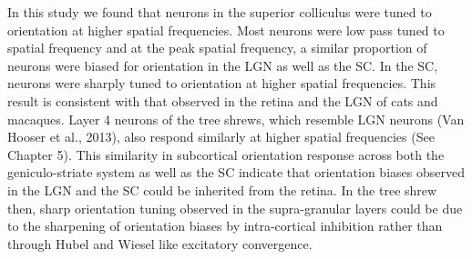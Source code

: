 In this study we found that neurons in the superior colliculus were
tuned to orientation at higher spatial frequencies. Most neurons were
low pass tuned to spatial frequency and at the peak spatial frequency, a
similar proportion of neurons were biased for orientation in the LGN as
well as the SC. In the SC, neurons were sharply tuned to orientation at
higher spatial frequencies. This result is consistent with that observed
in the retina and the LGN of cats and macaques. Layer 4 neurons of the
tree shrews, which resemble LGN neurons (Van Hooser et al., 2013), also
respond similarly at higher spatial frequencies (See Chapter 5). This
similarity in subcortical orientation response across both the
geniculo-striate system as well as the SC indicate that orientation
biases observed in the LGN and the SC could be inherited from the
retina. In the tree shrew then, sharp orientation tuning observed in the
supra-granular layers could be due to the sharpening of orientation
biases by intra-cortical inhibition rather than through Hubel and Wiesel
like excitatory convergence.
	